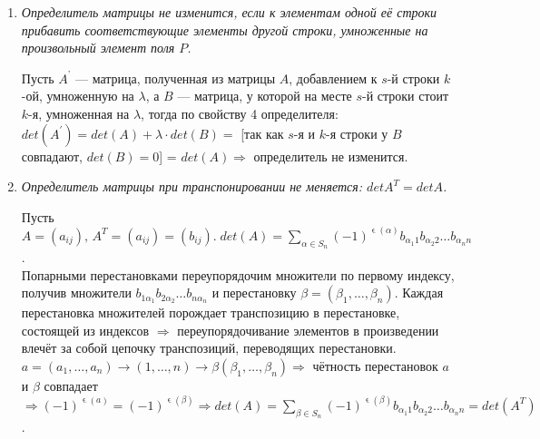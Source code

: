 \begin{enumerate}
	\begin{Proof}
		$det(A) = \sum\limits_{\alpha \in S_n}(-1)^{\upvarepsilon(\alpha)}a_{1\alpha_1}a_{2\alpha_2}\dots (a_{k_1\alpha_{k_1}} + a_{k_2\alpha_{k_2}})\dots a_{n\alpha_n} = \\
		= \sum\limits_{\alpha \in S_n}(-1)^{\upvarepsilon(\alpha)}a_{1\alpha_1}a_{2\alpha_2}\dots a_{k_1\alpha_{k_1}}\dots a_{n\alpha_n} + \sum\limits_{\alpha \in S_n}(-1)^{\upvarepsilon(\alpha)}a_{1\alpha_1}a_{2\alpha_2}\dots a_{k_2\alpha_{k_2}}\dots a_{n\alpha_n} = \\
		= det(A_1) + det(A_2)$.
	\end{Proof}
	\item \textit{Определитель матрицы не изменится, если к элементам одной её строки прибавить соответствующие элементы другой строки, умноженные на произвольный элемент поля $P$.}
	\begin{Proof}
		Пусть $A^{’}$ --- матрица, полученная из матрицы $A$, добавлением к $s$-й строки $k$-ой, умноженную на $\lambda$, а $B$ --- матрица, у которой на месте $s$-й строки стоит $k$-я, умноженная на $\lambda$, тогда по свойству 4 определителя: $det(A^{'}) = det(A) + \lambda \cdot det(B) = $ [так как $s$-я и $k$-я строки у $B$ совпадают, $det(B) = 0$] = $det(A) \Rightarrow $ определитель не изменится. 
	\end{Proof}
	\item \textit{Определитель матрицы при транспонировании не меняется: $det A^T = det A$.}
	\begin{Proof}
		Пусть $A = (a_{ij}), \, A^{T} = (a_{ij}) = (b_{ij}). \; det(A) = \sum\limits_{\alpha \in S_n}(-1)^{\upvarepsilon(\alpha)}b_{\alpha_1 1}b_{\alpha_2 2}\dots b_{\alpha_n n}$.\\
		Попарными перестановками переупорядочим множители по первому индексу, получив множители $b_{1\alpha_1}b_{2\alpha_2}\dots b_{n\alpha_n}$ и перестановку $\beta = (\beta_1,\dots,\beta_n)$. Каждая перестановка множителей порождает
		транспозицию в перестановке, состоящей из индексов $\Rightarrow$ переупорядочивание элементов в
		произведении влечёт за собой цепочку транспозиций, переводящих перестановки.\\
		$a = (a_1,\dots,a_n) \rightarrow (1,\dots,n) \rightarrow \beta(\beta_1,\dots,\beta_n) \Rightarrow$ чётность перестановок $a$ и $\beta$ совпадает $\Rightarrow (-1)^{\upvarepsilon(a)} = (-1)^{\upvarepsilon(\beta)} \Rightarrow det(A) = \sum\limits_{\beta \in S_n}(-1)^{\upvarepsilon(\beta)}b_{\alpha_1 1}b_{\alpha_2 2}\dots b_{\alpha_n n} = det(A^{T})$.
	\end{Proof}
\end{enumerate}


